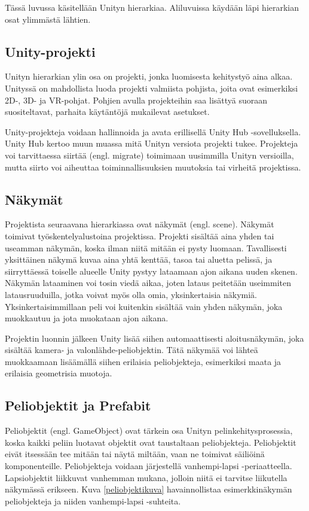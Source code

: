 \documentclass[utf8]{gradu3}
\begin{document}
Tässä luvussa käsitellään Unityn hierarkiaa. Aliluvuissa käydään läpi hierarkian osat ylimmästä lähtien.

\subsection{Unity-projekti}

Unityn hierarkian ylin osa on projekti, jonka luomisesta kehitystyö aina alkaa. Unityssä on mahdollista luoda projekti valmiista pohjista, joita ovat esimerkiksi 2D-, 3D- ja VR-pohjat. Pohjien avulla projekteihin saa lisättyä suoraan suositeltavat, parhaita käytäntöjä mukailevat asetukset.

Unity-projekteja voidaan hallinnoida ja avata erillisellä Unity Hub -sovelluksella. Unity Hub kertoo muun muassa mitä Unityn versiota projekti tukee. Projekteja voi tarvittaessa siirtää (engl. migrate) toimimaan uusimmilla Unityn versioilla, mutta siirto voi aiheuttaa toiminnallisuuksien muutoksia tai virheitä projektissa.

\subsection{Näkymät}

Projektista seuraavana hierarkiassa ovat näkymät (engl. scene). Näkymät toimivat työskentelyalustoina projektissa. Projekti sisältää aina yhden tai useamman näkymän, koska ilman niitä mitään ei pysty luomaan. Tavallisesti yksittäinen näkymä kuvaa aina yhtä kenttää, tasoa tai aluetta pelissä, ja siirryttäessä toiselle alueelle Unity pystyy lataamaan ajon aikana uuden skenen. Näkymän lataaminen voi tosin viedä aikaa, joten lataus peitetään useimmiten latausruuduilla, jotka voivat myös olla omia, yksinkertaisia näkymiä. Yksinkertaisimmillaan peli voi kuitenkin sisältää vain yhden näkymän, joka muokkautuu ja jota muokataan ajon aikana.

Projektin luonnin jälkeen Unity lisää siihen automaattisesti aloitusnäkymän, joka sisältää kamera- ja valonlähde-peliobjektin. Tätä näkymää voi lähteä muokkaamaan lisäämällä siihen erilaisia peliobjekteja, esimerkiksi maata ja erilaisia geometrisia muotoja.

\subsection{Peliobjektit ja Prefabit}

Peliobjektit (engl. GameObject) ovat tärkein osa Unityn pelinkehitysprosessia, koska kaikki peliin luotavat objektit ovat taustaltaan peliobjekteja. Peliobjektit eivät itsessään tee mitään tai näytä miltään, vaan ne toimivat säiliöinä komponenteille. Peliobjekteja voidaan järjestellä vanhempi-lapsi -periaatteella. Lapsiobjektit liikkuvat vanhemman mukana, jolloin niitä ei tarvitse liikutella näkymässä erikseen. Kuva \ref{peliobjektikuva} havainnollistaa esimerkkinäkymän peliobjekteja ja niiden vanhempi-lapsi -suhteita.
\end{document}

